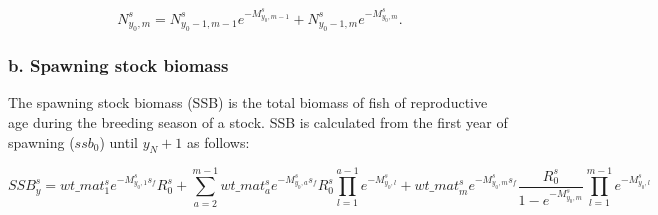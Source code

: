 \documentclass{article}
\begin{document}
\begin{equation}
N^s_{y_0,m}=N^s_{y_0-1,m-1}e^{-M^s_{y_0,m-1}}+N^s_{y_0-1,m}e^{-M^s_{y_0,m}}.
\end{equation}

\hfill

\hfill



\subsubsection{b. Spawning stock biomass}

The spawning stock biomass (SSB) is the total biomass of fish of reproductive age during the breeding season of a stock. SSB is calculated from the first year of spawning ($ssb_0$) until $y_N+1$ as follows:



\begin{equation}
    SSB^s_y=wt\_{mat}^s_1 e^{-M^s_{y_0,1}s_f} R^s_0 +  
            \sum_{a=2}^{m-1}wt\_{mat}^s_a e^{-M^s_{y_0,a}s_f} R^s_0\prod_{l=1}^{a-1}e^{-M^s_{y_0,l}} + 
            {wt\_mat}^s_{m} e^{-M^s_{y_0,m}s_f} \dfrac{R^s_0}{1-e^{-M^s_{y_0,m}}}\prod_{l=1}^{m-1}e^{-M^s_{y_0,l}}
\end{equation}
  
\end{document}

